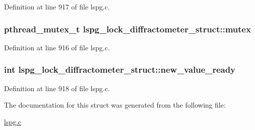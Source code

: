 Definition at line 917 of file lspg.\-c.

\hypertarget{structlspg__lock__diffractometer__struct_a362e848dfd1551428b8d12d8776fd2ed}{
\subsubsection[{mutex}]{\setlength{\rightskip}{0pt plus 5cm}pthread\-\_\-mutex\-\_\-t lspg\-\_\-lock\-\_\-diffractometer\-\_\-struct\-::mutex}}\label{structlspg__lock__diffractometer__struct_a362e848dfd1551428b8d12d8776fd2ed}


Definition at line 916 of file lspg.\-c.

\hypertarget{structlspg__lock__diffractometer__struct_ae94acdf44008ce48930e3083f08f5b6c}{
\subsubsection[{new\-\_\-value\-\_\-ready}]{\setlength{\rightskip}{0pt plus 5cm}int lspg\-\_\-lock\-\_\-diffractometer\-\_\-struct\-::new\-\_\-value\-\_\-ready}}\label{structlspg__lock__diffractometer__struct_ae94acdf44008ce48930e3083f08f5b6c}


Definition at line 918 of file lspg.\-c.



The documentation for this struct was generated from the following file\-:\begin{DoxyCompactItemize}
\item 
\hyperlink{lspg_8c}{lspg.\-c}\end{DoxyCompactItemize}
